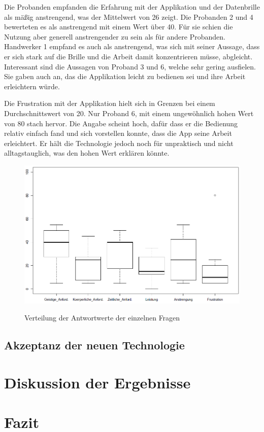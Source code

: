 Die Probanden empfanden die Erfahrung mit der Applikation und der Datenbrille als mäßig anstrengend, was der Mittelwert von 26 zeigt. Die Probanden 2 und 4 bewerteten es als anstrengend mit einem Wert über 40. Für sie schien die Nutzung aber generell anstrengender zu sein als für andere Probanden. Handwerker 1 empfand es auch als anstrengend, was sich mit seiner Aussage, dass er sich stark auf die Brille und die Arbeit damit konzentrieren müsse, abgleicht. Interessant sind die Aussagen von Proband 3 und 6, welche sehr gering ausfielen. Sie gaben auch an, das die Applikation leicht zu bedienen sei und ihre Arbeit erleichtern würde.

Die Frustration mit der Applikation hielt sich in Grenzen bei einem Durchschnittswert von 20. Nur Proband 6, mit einem ungewöhnlich hohen Wert von 80 stach hervor. Die Angabe scheint hoch, dafür dass er die Bedienung relativ einfach fand und sich vorstellen konnte, dass die App seine Arbeit erleichtert. Er hält die Technologie jedoch noch für unpraktisch und nicht alltagstauglich, was den hohen Wert erklären könnte. 

\begin{figure}[h]
	\begin{center}
		\includegraphics[scale=0.5]{Resources/Evaluation/nasa_questions.png}
		\label{nasa_questions}
		\caption{Verteilung der Antwortwerte der einzelnen Fragen}	
	\end{center}
\end{figure}

\subsection{Akzeptanz der neuen Technologie}

\section{Diskussion der Ergebnisse}

\section{Fazit}